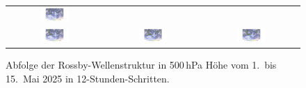 \begin{figure}
\begin{tabular}{ccc}
		\includegraphics[width=0.32\textwidth, trim=5.75cm 3cm 5cm 0.9cm, clip]{papers/rossby/images/weather/data_2025_5_3_12-00_500.pdf}   \\
		\includegraphics[width=0.32\textwidth, trim=5.75cm 3cm 5cm 0.9cm, clip]{papers/rossby/images/weather/data_2025_5_4_00-00_500.pdf} &
		\includegraphics[width=0.32\textwidth, trim=5.75cm 3cm 5cm 0.9cm, clip]{papers/rossby/images/weather/data_2025_5_4_12-00_500.pdf} &
		\includegraphics[width=0.32\textwidth, trim=5.75cm 3cm 5cm 0.9cm, clip]{papers/rossby/images/weather/data_2025_5_5_00-00_500.pdf}   \\
	\end{tabular}
	\caption{Abfolge der Rossby-Wellenstruktur in 500\,hPa Höhe vom 1.\ bis 15.\ Mai 2025 in 12-Stunden-Schritten.}
	\label{fig:rossby_grid}
\end{figure}

